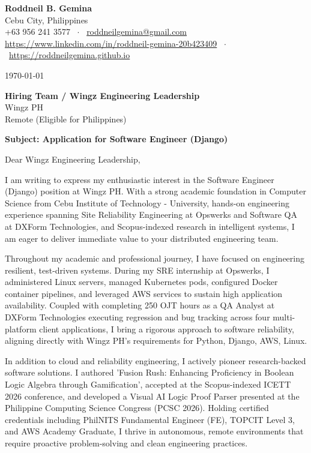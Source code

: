 \documentclass[letterpaper,11pt]{article}
\begin{document}
\textbf{Roddneil B. Gemina} \\
Cebu City, Philippines \\
+63 956 241 3577 \ $\cdot$ \ \href{mailto:roddneilgemina@gmail.com}{roddneilgemina@gmail.com} \\
\href{https://www.linkedin.com/in/roddneil-gemina-20b423409}{https://www.linkedin.com/in/roddneil-gemina-20b423409} \ $\cdot$ \ \href{https://roddneilgemina.github.io}{https://roddneilgemina.github.io}

\vspace{12pt}
\today

\vspace{8pt}
\textbf{Hiring Team / Wingz Engineering Leadership} \\
Wingz PH \\
Remote (Eligible for Philippines)

\vspace{8pt}
\textbf{Subject: Application for Software Engineer (Django)}

\vspace{4pt}
Dear Wingz Engineering Leadership,

I am writing to express my enthusiastic interest in the Software Engineer (Django) position at Wingz PH. With a strong academic foundation in Computer Science from Cebu Institute of Technology - University, hands-on engineering experience spanning Site Reliability Engineering at Opswerks and Software QA at DXForm Technologies, and Scopus-indexed research in intelligent systems, I am eager to deliver immediate value to your distributed engineering team.

Throughout my academic and professional journey, I have focused on engineering resilient, test-driven systems. During my SRE internship at Opswerks, I administered Linux servers, managed Kubernetes pods, configured Docker container pipelines, and leveraged AWS services to sustain high application availability. Coupled with completing 250 OJT hours as a QA Analyst at DXForm Technologies executing regression and bug tracking across four multi-platform client applications, I bring a rigorous approach to software reliability, aligning directly with Wingz PH's requirements for Python, Django, AWS, Linux.

In addition to cloud and reliability engineering, I actively pioneer research-backed software solutions. I authored 'Fusion Rush: Enhancing Proficiency in Boolean Logic Algebra through Gamification', accepted at the Scopus-indexed ICETT 2026 conference, and developed a Visual AI Logic Proof Parser presented at the Philippine Computing Science Congress (PCSC 2026). Holding certified credentials including PhilNITS Fundamental Engineer (FE), TOPCIT Level 3, and AWS Academy Graduate, I thrive in autonomous, remote environments that require proactive problem-solving and clean engineering practices.
\end{document}
